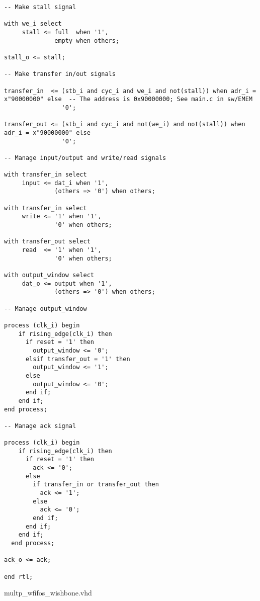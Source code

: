 \begin{code}
\begin{verbatim}
-- Make stall signal

with we_i select 
     stall <= full  when '1',
              empty when others;

stall_o <= stall;

-- Make transfer in/out signals

transfer_in  <= (stb_i and cyc_i and we_i and not(stall)) when adr_i = x"90000000" else  -- The address is 0x90000000; See main.c in sw/EMEM
                '0';

transfer_out <= (stb_i and cyc_i and not(we_i) and not(stall)) when adr_i = x"90000000" else
                '0';

-- Manage input/output and write/read signals

with transfer_in select
     input <= dat_i when '1',
              (others => '0') when others;

with transfer_in select
     write <= '1' when '1',
              '0' when others;

with transfer_out select
     read  <= '1' when '1',
              '0' when others;

with output_window select
     dat_o <= output when '1',
              (others => '0') when others;

-- Manage output_window

process (clk_i) begin
    if rising_edge(clk_i) then
      if reset = '1' then
        output_window <= '0';
      elsif transfer_out = '1' then
        output_window <= '1';
      else
        output_window <= '0';
      end if;
    end if;
end process;

-- Manage ack signal

process (clk_i) begin
    if rising_edge(clk_i) then
      if reset = '1' then
        ack <= '0';
      else
        if transfer_in or transfer_out then
          ack <= '1';
        else
          ack <= '0';
        end if;
      end if;
    end if;
  end process;
                
ack_o <= ack;

end rtl;
\end{verbatim}
\caption{multp\_wfifos\_wishbone.vhd}
\label{ap-cod:9}
\end{code}

